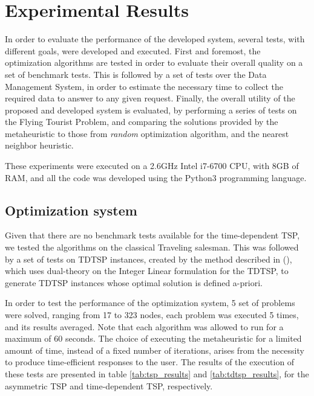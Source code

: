 \label{cap:ER}


\section{Experimental Results}
\label{sec:results}

In order to evaluate the performance of the developed system, several tests, with different goals, were developed and executed. First and foremost, the optimization algorithms are tested in order to evaluate their overall quality on a set of benchmark tests. This is followed by a set of tests over the Data Management System, in order to estimate the necessary time to collect the required data to answer to any given request. Finally, the overall utility of the proposed and developed system is evaluated, by performing a series of tests on the Flying Tourist Problem, and comparing the solutions provided by the metaheuristic to those from \textit{random} optimization algorithm, and the nearest neighbor heuristic.

These experiments were executed on a 2.6GHz Intel i7-6700 CPU, with 8GB of RAM, and all the code was developed using the Python3 programming language. 


\subsection{Optimization system}
Given that there are no benchmark tests available for the time-dependent TSP, we tested the algorithms on the classical Traveling salesman. This was followed by a set of tests on TDTSP instances, created by the method described in (\cite{TDTSP_construction}), which uses dual-theory on the Integer Linear formulation for the TDTSP, to generate TDTSP instances whose optimal solution is defined a-priori.

In order to test the performance of the optimization system, 5 set of problems were solved, ranging from 17 to 323 nodes, each problem was executed 5 times, and its results averaged. Note that each algorithm was allowed to run for a maximum of 60 seconds. The choice of executing the metaheuristic for a limited amount of time, instead of a fixed number of iterations, arises from the necessity to produce time-efficient responses to the user. The results of the execution of these tests are presented in table \ref{tab:tsp_results} and \ref{tab:tdtsp_results}, for the asymmetric TSP and time-dependent TSP, respectively.

